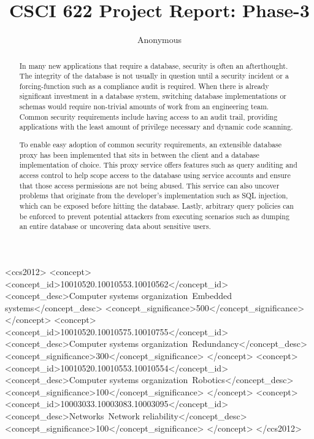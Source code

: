 \documentclass[sigconf]{acmart}
\begin{document}
%
\title{CSCI 622 Project Report: Phase-3}

%
\author{Anonymous}
%
\begin{abstract}
In many new applications that require a database, security is often an afterthought. The integrity of the database is not usually in question until a security incident or a forcing-function such as a compliance audit is required. When there is already significant investment in a database system, switching database implementations or schemas would require non-trivial amounts of work from an engineering team. Common security requirements include having access to an audit trail, providing applications with the least amount of privilege necessary and dynamic code scanning.

To enable easy adoption of common security requirements, an extensible database proxy has been implemented that sits in between the client and a database implementation of choice. This proxy service offers features such as query auditing and access control to help scope access to the database using service accounts and ensure that those access permissions are not being abused. This service can also uncover problems that originate from the developer's implementation such as SQL injection, which can be exposed before hitting the database. Lastly, arbitrary query policies can be enforced to prevent potential attackers from executing scenarios such as dumping an entire database or uncovering data about sensitive users.
\end{abstract}

%
%
\begin{CCSXML}
<ccs2012>
 <concept>
  <concept_id>10010520.10010553.10010562</concept_id>
  <concept_desc>Computer systems organization~Embedded systems</concept_desc>
  <concept_significance>500</concept_significance>
 </concept>
 <concept>
  <concept_id>10010520.10010575.10010755</concept_id>
  <concept_desc>Computer systems organization~Redundancy</concept_desc>
  <concept_significance>300</concept_significance>
 </concept>
 <concept>
  <concept_id>10010520.10010553.10010554</concept_id>
  <concept_desc>Computer systems organization~Robotics</concept_desc>
  <concept_significance>100</concept_significance>
 </concept>
 <concept>
  <concept_id>10003033.10003083.10003095</concept_id>
  <concept_desc>Networks~Network reliability</concept_desc>
  <concept_significance>100</concept_significance>
 </concept>
</ccs2012>
\end{CCSXML}
\end{document}
